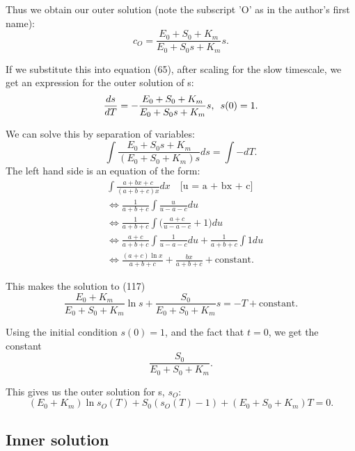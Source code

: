\documentclass[12pt]{article}
\begin{document}
Thus we obtain our outer solution (note the subscript 'O' as in the
author's first name):
\begin{equation}
  c_O = \frac{E_0 + S_0 + K_m}{E_0+S_0 s+K_m} s.
\end{equation}

If we substitute this into equation (65), after scaling for the slow
timescale, we get an expression for the outer solution of s:
\begin{equation}
\frac{ds}{dT} = - \frac{E_0 + S_0 + K_m}{E_0 + S_0s + K_m}s, \enskip s(0) = 1.
\end{equation}

We can solve this by separation of variables:
\begin{equation}
\int \frac{E_0 + S_0 s + K_m}{(E_0 + S_0 + K_m) s} ds = \int - dT.
\end{equation}
The left hand side is an equation of the form:
\begin{align}
&\int \frac{a + b x + c}{(a + b + c) x} dx
        \quad \text{[u = a + bx + c]} \\
&\iff \frac{1}{a+b+c} \int \frac{u}{u - a -c} du \\
&\iff \frac{1}{a+b+c} \int \Big(\frac{a+c}{u - a -c} + 1\Big)
                          du \\
&\iff \frac{a+c}{a+b+c} \int \frac{1}{u - a - c} du
                    + \frac{1}{a+b+c} \int 1 du \\
&\iff \frac{(a+c) \ln{x}}{a+b+c} + \frac{bx}{a+b+c} + \text{constant}.
\end{align}

This makes the solution to (117)
\begin{equation}
\frac{E_0+K_m}{E_0 + S_0 + K_m} \ln{s} + \frac{S_0}{E_0 + S_0 + K_m} s = - T + \text{constant}.
\end{equation}

Using the initial condition $s(0)=1$, and the fact that $t=0$, we get
the constant
\begin{equation}
  \frac{S_0}{E_0 + S_0 + K_m}.
\end{equation}

This gives us the outer solution for s, $s_O$:
\begin{equation}
  (E_0+K_m) \ln{s_O(T)} + S_0 (s_O(T) - 1) + (E_0 + S_0 + K_m) T = 0.
\end{equation}

\subsection{Inner solution}
\end{document}
